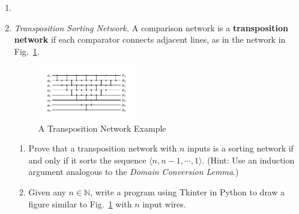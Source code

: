 \documentclass[12pt,a4paper]{article}
\makeatletter
\newtheorem*{solution}{Solution}
\theoremstyle{definition}
\renewenvironment{solution}[1][Solution] {\par\pushQED{\qed}\normalfont\topsep6\p@\@plus6\p@\relax\trivlist\item[\hskip\labelsep\bfseries#1\@addpunct{.}]\ignorespaces}{\popQED\endtrivlist\@endpefalse} \makeatother
\makeatother
\begin{document}
\begin{enumerate}
\begin{solution}
\begin{enumerate}
\end{enumerate}
\end{solution}
\item
\textit{Transposition Sorting Network.} A comparison network is a \textbf{transposition network}  if each comparator connects adjacent lines, as in the network in Fig.~\ref{Fig-Transposition}.

\begin{figure}[htbp]
    \centering
    \includegraphics[width=0.4\textwidth]{Fig-Transposition.pdf}
    \caption{A Transposition Network Example}\label{Fig-Transposition}
\end{figure}


\begin{enumerate}
\item Prove that a transposition network with $n$ inputs is a sorting network if and only if it sorts the sequence $\langle n, n-1, \cdots, 1 \rangle$. {\color{blue}(Hint: Use an induction argument analogous to the \emph{Domain Conversion Lemma}.)}
\item {\color{red}{(Optional Sub-question with Bonus)}} Given any $n \in \mathbb{N}$, write a program using Tkinter in Python to draw a figure similar to Fig.~\ref{Fig-Transposition} with $n$ input wires.
\end{enumerate}
\end{enumerate}
\end{document}
